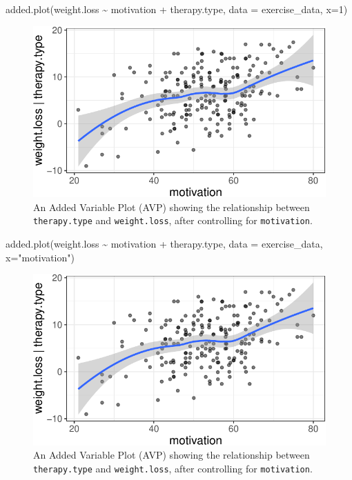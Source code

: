 \documentclass[
  english,
  man]{apa6}
\newenvironment{Shaded}{\begin{snugshade}}{\end{snugshade}}
\newcommand{\AttributeTok}[1]{\textcolor[rgb]{0.77,0.63,0.00}{#1}}
\newcommand{\DecValTok}[1]{\textcolor[rgb]{0.00,0.00,0.81}{#1}}
\newcommand{\FunctionTok}[1]{\textcolor[rgb]{0.00,0.00,0.00}{#1}}
\newcommand{\NormalTok}[1]{#1}
\newcommand{\SpecialCharTok}[1]{\textcolor[rgb]{0.00,0.00,0.00}{#1}}
\newcommand{\StringTok}[1]{\textcolor[rgb]{0.31,0.60,0.02}{#1}}
\begin{document}
\begin{Shaded}
\begin{Highlighting}[]
\FunctionTok{added.plot}\NormalTok{(weight.loss }\SpecialCharTok{\textasciitilde{}}\NormalTok{ motivation }\SpecialCharTok{+}\NormalTok{ therapy.type, }\AttributeTok{data =}\NormalTok{ exercise\_data, }\AttributeTok{x=}\DecValTok{1}\NormalTok{) }
\end{Highlighting}
\end{Shaded}

\begin{figure}
\centering
\includegraphics{flexplot_psychmeth_files/figure-latex/avp-2.pdf}
\caption{\label{fig:avp-2}An Added Variable Plot (AVP) showing the relationship between \texttt{therapy.type} and \texttt{weight.loss}, after controlling for \texttt{motivation}. \label{fig:avp}}
\end{figure}

\begin{Shaded}
\begin{Highlighting}[]
\FunctionTok{added.plot}\NormalTok{(weight.loss }\SpecialCharTok{\textasciitilde{}}\NormalTok{ motivation }\SpecialCharTok{+}\NormalTok{ therapy.type, }\AttributeTok{data =}\NormalTok{ exercise\_data, }\AttributeTok{x=}\StringTok{"motivation"}\NormalTok{) }
\end{Highlighting}
\end{Shaded}

\begin{figure}
\centering
\includegraphics{flexplot_psychmeth_files/figure-latex/avp-3.pdf}
\caption{\label{fig:avp-3}An Added Variable Plot (AVP) showing the relationship between \texttt{therapy.type} and \texttt{weight.loss}, after controlling for \texttt{motivation}. \label{fig:avp}}
\end{figure}
\end{document}
